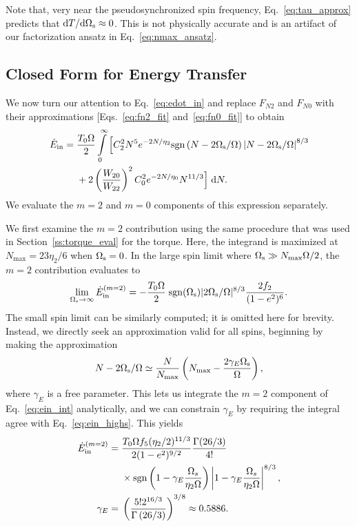 \documentclass[
        fleqn,
        usenatbib,
    ]{mnras}
\newcommand*{\rdil}[2]{\mathrm{d}#1 / \mathrm{d}#2}
\newcommand*{\p}[1]{\left(#1\right)}
\begin{document}
Note that, very near the pseudosynchronized spin frequency,
Eq.~\eqref{eq:tau_approx} predicts that $\rdil{T}{\Omega_{\rm s}} \approx 0$.
This is not physically accurate and is an artifact of our factorization ansatz
in Eq.~\eqref{eq:nmax_ansatz}.

\subsection{Closed Form for Energy Transfer}

We now turn our attention to Eq.~\eqref{eq:edot_in} and replace $F_{N2}$ and
$F_{N0}$ with their approximations [Eqs.~\eqref{eq:fn2_fit}
and~\eqref{eq:fn0_fit}] to obtain
\begin{align}
    \dot{E}_{\rm in} ={}&
        \frac{T_0 \Omega}{2} \int\limits_0^\infty \Big[
            C_2^2 N^5 e^{-2N/\eta_2} \mathrm{sgn}\left(N - 2\Omega_{\rm s} /
                \Omega\right) \left|N - 2 \Omega_{\rm s} /
                \Omega\right|^{8/3}\nonumber\\
            &+ 2 \p{\frac{W_{20}}{W_{22}}}^2 C_0^2 e^{-2N / \eta_0} N^{11/3}
        \Big]\;\mathrm{d}N.\label{eq:ein_int}
\end{align}
We evaluate the $m = 2$ and $m = 0$ components of this expression separately.

We first examine the $m = 2$ contribution using the same procedure that was used
in Section~\ref{ss:torque_eval} for the torque. Here, the integrand is maximized
at $N_{\max} = 23\eta_2 / 6$ when $\Omega_{\rm s} = 0$. In the large spin limit
where $\Omega_{\rm s} \gg N_{\max}\Omega / 2$, the $m = 2$ contribution
evaluates to
\begin{equation}
    \lim_{\Omega_{\rm s} \to \infty} \dot{E}_{\rm in}^{(m=2)} =
        -\frac{T_0\Omega}{2} \; \mathrm{sgn}(\Omega_{\rm s})|2\Omega_{\rm
        s}/\Omega|^{8/3} \frac{2f_2}{(1 - e^2)^6}.\label{eq:ein_highs}
\end{equation}
The small spin limit can be similarly computed; it is omitted here for brevity.
Instead, we directly seek an approximation valid for all spins, beginning by
making the approximation
\begin{equation}
    N - 2\Omega_{\rm s} / \Omega \simeq \frac{N}{N_{\max}}
        \left(N_{\max} - \frac{2\gamma_E
        \Omega_{\rm s}}{\Omega}\right)\label{eq:nmax_ansatz},
\end{equation}
where $\gamma_E$ is a free parameter. This lets us integrate the $m = 2$
component of Eq.~\eqref{eq:ein_int} analytically, and we can constrain
$\gamma_E$ by requiring the integral agree with Eq.~\eqref{eq:ein_highs}. This
yields
\begin{align}
    \dot{E}_{\rm in}^{(m=2)}
        ={}& \frac{T_0\Omega f_5 (\eta_2/2)^{11/3}}{2(1-e^2)^{9/2}}
            \frac{\Gamma(26/3)}{4!}\nonumber\\
        &\times \mathrm{sgn}\p{1 - \gamma_E\frac{\Omega_s}{\eta_2 \Omega}}
            \left|1 - \gamma_E\frac{\Omega_s}{\eta_2 \Omega}\right|^{8/3},\\
    \gamma_E ={}& \p{\frac{5! 2^{16/3}}{\Gamma\p{26/3}}}^{3/8}
        \approx 0.5886.
\end{align}
\end{document}
